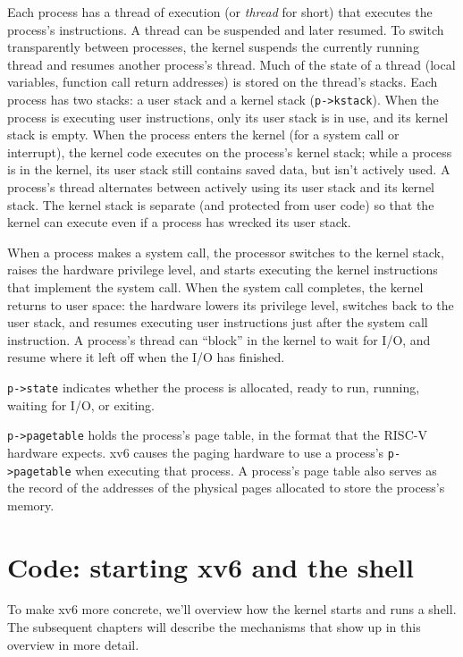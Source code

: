 Each process has a thread of execution (or 
\textit{thread}
for short) that executes the process's instructions.
A thread can be suspended and later resumed.
To switch transparently between processes,
the kernel suspends the currently running thread and resumes another process's
thread.  Much of the state of a thread (local variables, function call return
addresses) is stored on the thread's stacks.
Each process has two stacks: a user stack and a kernel stack
(\lstinline{p->kstack}).
When the process is executing user instructions, only its user stack
is in use, and its kernel stack is empty.
When the process enters the kernel (for a system call or interrupt),
the kernel code executes on the process's kernel stack; while
a process is in the kernel, its user stack still contains saved
data, but isn't actively used.
A process's thread alternates between actively using its user stack
and its kernel stack. The kernel stack is separate (and protected from
user code) so that the kernel
can execute even if a process has wrecked its user stack.

When a process makes a system call, the processor switches to the 
kernel stack, raises the hardware privilege level, and starts
executing the kernel instructions that implement the system call.
When the system call completes, the kernel returns to user space:
the hardware lowers its privilege level, switches back to the
user stack, and resumes executing user instructions just after
the system call instruction.
A process's thread
can ``block'' in the kernel to wait for I/O, and resume where it left
off when the I/O has finished.

\lstinline{p->state} 
indicates whether the process is allocated, ready
to run, running, waiting for I/O, or exiting.

\lstinline{p->pagetable}
holds the process's page table, in the format
that the RISC-V hardware expects.
xv6 causes the paging hardware to use a process's
\lstinline{p->pagetable}
when executing that process.
A process's page table also serves as the record of the
addresses of the physical pages allocated to store the process's memory.
\section{Code: starting xv6 and the shell}
To make xv6 more concrete, we'll overview how the kernel starts and
runs a shell. The subsequent chapters will describe the mechanisms
that show up in this overview in more detail.

